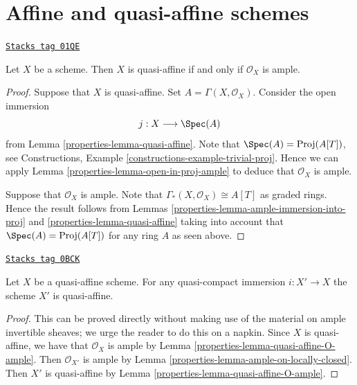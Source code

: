 \section{Affine and quasi-affine schemes}
\label{properties-section-affine-quasi-affine}
\begin{lemma}
\label{properties-lemma-quasi-affine-O-ample}
\href{https://stacks.math.columbia.edu/tag/01QE}{\texttt{Stacks tag 01QE}}

Let $X$ be a scheme.
Then $X$ is quasi-affine if and only if $\mathcal{O}_X$ is ample.
\end{lemma}

\begin{proof}

Suppose that $X$ is quasi-affine. Set $A = \Gamma(X, \mathcal{O}_X)$.
Consider the open immersion
$$
j : X \longrightarrow \Spec(A)
$$
from Lemma \ref{properties-lemma-quasi-affine}. Note that
$\Spec(A) = \text{Proj}(A[T])$, see
Constructions, Example \ref{constructions-example-trivial-proj}.
Hence we can apply Lemma \ref{properties-lemma-open-in-proj-ample}
to deduce that $\mathcal{O}_X$ is ample.

\medskip\noindent
Suppose that $\mathcal{O}_X$ is ample.
Note that $\Gamma_*(X, \mathcal{O}_X) \cong A[T]$
as graded rings. Hence the result follows from Lemmas
\ref{properties-lemma-ample-immersion-into-proj} and \ref{properties-lemma-quasi-affine}
taking into account that
$\Spec(A) = \text{Proj}(A[T])$ for any ring $A$
as seen above.
\end{proof}

\begin{lemma}
\label{properties-lemma-quasi-affine-locally-closed}
\href{https://stacks.math.columbia.edu/tag/0BCK}{\texttt{Stacks tag 0BCK}}

Let $X$ be a quasi-affine scheme. For any quasi-compact immersion
$i : X' \to X$ the scheme $X'$ is quasi-affine.
\end{lemma}

\begin{proof}

This can be proved directly without making use of the material on
ample invertible sheaves; we urge the reader to do this on a napkin.
Since $X$ is quasi-affine, we have that $\mathcal{O}_X$ is ample by
Lemma \ref{properties-lemma-quasi-affine-O-ample}.
Then $\mathcal{O}_{X'}$ is ample by
Lemma \ref{properties-lemma-ample-on-locally-closed}. Then $X'$ is quasi-affine by
Lemma \ref{properties-lemma-quasi-affine-O-ample}.
\end{proof}

